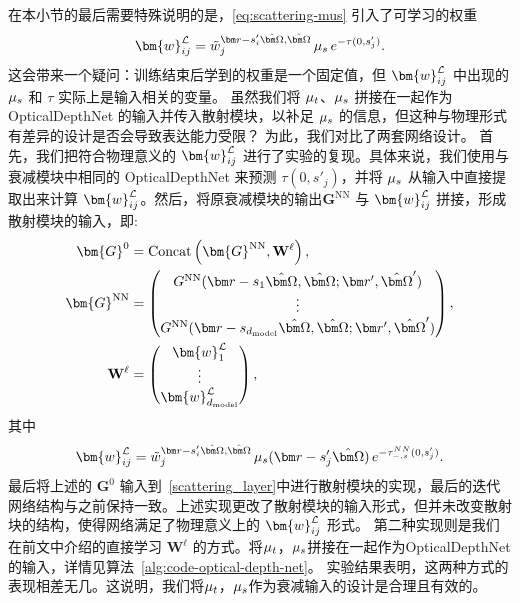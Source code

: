在本小节的最后需要特殊说明的是，\eqref{eq:scattering-mus} 引入了可学习的权重
\begin{equation}
    \bm{w}^\cL_{ij} = \tilde{w}_j^{\br-s'_i \bOmega, \bOmega} \,\mus\, e^{-\tau(0,s'_j)}.
\end{equation}
这会带来一个疑问：训练结束后学到的权重是一个固定值，但 $\bm{w}^\cL_{ij}$ 中出现的 $\mu_s$ 和 $\tau$ 实际上是输入相关的变量。
虽然我们将 $\mu_t$、$\mu_s$ 拼接在一起作为 OpticalDepthNet 的输入并传入散射模块，以补足 $\mu_s$ 的信息，但这种与物理形式有差异的设计是否会导致表达能力受限？
为此，我们对比了两套网络设计。
首先，我们把符合物理意义的 $\bm{w}^\cL_{ij}$ 进行了实验的复现。具体来说，我们使用与衰减模块中相同的 OpticalDepthNet 来预测 $\tau(0,s'_j)$，并将 $\mu_s$ 从输入中直接提取出来计算 $\bm{w}^\cL_{ij}$。然后，将原衰减模块的输出$\bm{G}^{\text{NN}}$ 与 $\bm{w}^\cL_{ij}$ 拼接，形成散射模块的输入，即:
\begin{equation}
    \begin{aligned}
        \bm{G}^{0}         & = \mathrm{Concat}\left(\bm{G}^{\text{NN}}, \mathbf{W}^\ell\right),          \\
        \bm{G}^{\text{NN}} & =
        \begin{pmatrix}
            G^{\text{NN}}(\br-s_1 \bOmega, \bOmega; \br', \bOmega') \\
            \vdots                                                  \\
            G^{\text{NN}}(\br-s_{d_{\text{model}}} \bOmega, \bOmega; \br', \bOmega')
        \end{pmatrix}, \\
        \mathbf{W}^\ell    & =
        \begin{pmatrix}
            \bm{w}^\cL_1 \\
            \vdots       \\
            \bm{w}^\cL_{d_{\text{model}}}
        \end{pmatrix},
    \end{aligned}
\end{equation}
其中
\begin{equation}
    \bm{w}^\cL_{ij} = \tilde{w}_j^{\br-s'_i \bOmega, \bOmega} \,\mus(\br-s'_j\bOmega)\, e^{-\tau^{NN}_{-,s}(0,s'_j)}.
\end{equation}
最后将上述的 $\bm{G}^0$ 输入到~\eqref{scattering_layer}中进行散射模块的实现，最后的迭代网络结构与之前保持一致。上述实现更改了散射模块的输入形式，但并未改变散射块的结构，使得网络满足了物理意义上的 $\bm{w}^\cL_{ij}$ 形式。
第二种实现则是我们在前文中介绍的直接学习 $\bm{W}^\ell$ 的方式。将$\mu_t$，$\mu_s$拼接在一起作为OpticalDepthNet的输入，详情见算法~\ref{alg:code-optical-depth-net}。
实验结果表明，这两种方式的表现相差无几。这说明，我们将$\mu_t$，$\mu_s$作为衰减输入的设计是合理且有效的。